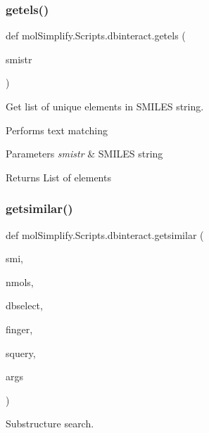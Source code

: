 \subsubsection{\texorpdfstring{getels()}{getels()}}
{\footnotesize\ttfamily def mol\+Simplify.\+Scripts.\+dbinteract.\+getels (\begin{DoxyParamCaption}\item[{}]{smistr }\end{DoxyParamCaption})}



Get list of unique elements in S\+M\+I\+L\+ES string. 

Performs text matching 
\begin{DoxyParams}{Parameters}
{\em smistr} & S\+M\+I\+L\+ES string \\
\hline
\end{DoxyParams}
\begin{DoxyReturn}{Returns}
List of elements 
\end{DoxyReturn}
\mbox{\label{namespacemolSimplify_1_1Scripts_1_1dbinteract_ae1b41b44ad2be286cff8e18f87e75dc8}} 
\subsubsection{\texorpdfstring{getsimilar()}{getsimilar()}}
{\footnotesize\ttfamily def mol\+Simplify.\+Scripts.\+dbinteract.\+getsimilar (\begin{DoxyParamCaption}\item[{}]{smi,  }\item[{}]{nmols,  }\item[{}]{dbselect,  }\item[{}]{finger,  }\item[{}]{squery,  }\item[{}]{args }\end{DoxyParamCaption})}



Substructure search. 


